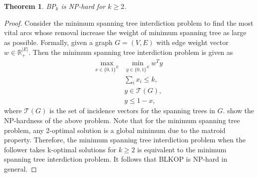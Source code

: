 \documentclass[11pt]{article}
\newtheorem{theorem}{Theorem}
\newcommand{\RR}{\mathbb{R}}
\begin{document}
\begin{theorem}
	BP$_k$ is NP-hard for $k\geq2$.
\end{theorem}
\begin{proof}
	Consider the minimum spanning tree interdiction problem \cite{frederickson1999increasing} to find the most vital arcs whose removal increase the weight of minimum spanning tree as large as possible. Formally, given a graph $G = (V, E)$ with edge weight vector $w\in \RR_+^{|E|}$. Then the minimum spanning tree interdiction problem is given as
	\begin{align*}
		\max_{x\in \{0,1\}^E}&  \min_{y\in \{0,1\}^E} w^Ty \\
		&  \sum_{i} x_i \leq k, \\
		&  y \in \mathcal{T}(G), \\
		&  y \leq 1 - x,
	\end{align*} 
	where $\mathcal{T}(G)$ is the set of incidence vectors for the spanning trees in $G$. \citet{frederickson1999increasing} show the NP-hardness of the above problem. Note that for the minimum spanning tree problem, any 2-optimal solution is a global minimum due to the matroid property. Therefore, the minimum spanning tree interdiction problem when the follower takes k-optimal solutions for $k\geq 2$ is equivalent to the minimum spanning tree interdiction problem. It follows that BLKOP is NP-hard in general. 
\end{proof}
\end{document}
